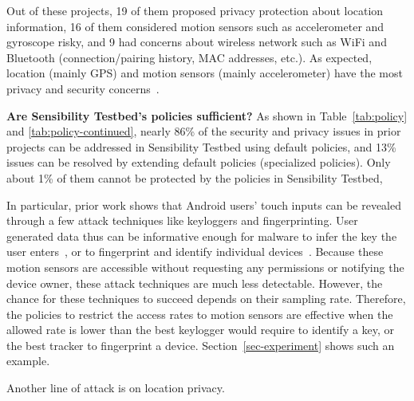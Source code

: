 Out of these projects, 
19 of them proposed privacy protection about location information, 16 of 
them considered motion sensors such as accelerometer and gyroscope 
risky, and 9 had concerns about wireless network such as WiFi and Bluetooth
(connection/pairing history, MAC addresses, etc.). As expected, location (mainly GPS)
and motion sensors (mainly accelerometer) have the most privacy and security 
concerns~\cite{chakraborty2014ipshield}.

\textbf{Are Sensibility Testbed's policies sufficient?}
As shown in Table~\ref{tab:policy} and \ref{tab:policy-continued}, nearly 86\% 
of the security and privacy issues in prior projects can be addressed in 
Sensibility Testbed using default policies, and 13\% issues can be resolved by extending 
default policies (specialized policies). Only about 1\% of them cannot
be protected by the policies in Sensibility Testbed, 

In particular, prior work shows 
that Android users' touch inputs can be revealed through a few attack 
techniques like keyloggers and fingerprinting. 
User generated data thus can be informative enough 
for malware to infer the key the user enters~\cite{cai2011touchlogger, 
owusu2012accessory}, or to fingerprint and identify individual 
devices~\cite{bojinov2014mobile, dey2014accelprint}. Because these 
motion sensors are accessible 
without requesting any 
permissions or notifying the device owner, these attack techniques are much 
less detectable. However, the chance for these techniques to succeed
depends on their sampling rate. 
Therefore, the policies to restrict the access rates to motion sensors 
are effective when the allowed rate is lower than the best keylogger 
would require to identify a key, or the best tracker to fingerprint a device.
Section~\ref{sec-experiment} shows such an example. 

Another line of attack is on location privacy. 

